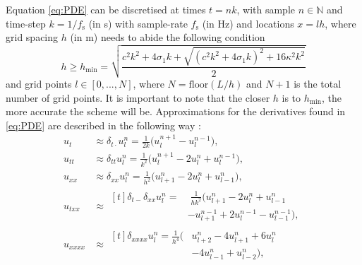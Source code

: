 \documentclass[twoside,a4paper,dvipsnames]{article}
\begin{document}
Equation \eqref{eq:PDE} can be discretised at times $t = nk$, with sample $n \in \mathbb{N}$ and time-step $k = 1 / f_\text{s}$ (in s) with sample-rate $f_\text{s}$ (in Hz) and locations $x = lh$, where grid spacing $h$ (in m) needs to abide the following condition \cite{Bilbao2009}
\begin{equation}\label{eq:stability}
    h \geq h_\text{min} = \sqrt{\frac{c^2k^2+4 \sigma_1k+\sqrt{(c^2k^2+4\sigma_1k)^2+16\kappa^2k^2}}{2}}
\end{equation}
and grid points $l \in [0,...,N]$, where $N=\text{floor}(L/h)$ and $N + 1$ is the total number of grid points. It is important to note that the closer $h$ is to $h_\text{min}$, the more accurate the scheme will be. 
Approximations for the derivatives found in \eqref{eq:PDE} are described in the following way \cite{Bilbao2009}: 
\begin{subequations}\label{eq:approximations}
    \begin{align}
        \label{eq:centerTime}
        u_{t} &\approx \delta_{t\cdot} u^n_l = \frac{1}{2k}\big(u_l^{n+1}-u_l^{n-1}\big),\\
        \label{eq:secondTime}
        u_{tt} &\approx \delta_{tt}u_l^n = \frac{1}{k^2} \big(u_l^{n+1} - 2u_l^n + u_l^{n-1}\big),\\
        \label{eq:secondSpacex}
        u_{xx} &\approx \delta_{xx}u_l^n = \frac{1}{h^2}\big(u_{l+1}^n - 2u_l^n + u_{l-1}^n\big),\\
        u_{txx} &\approx \label{eq:timeSpace}
        \begin{aligned}[t]\delta_{t-}\delta_{xx}u_l^n =& \; \frac{1}{hk^2}\big(u_{l+1}^n - 2u_l^n + u_{l-1}^n \\
        &- u_{l+1}^{n-1} + 2u_l^{n-1} - u_{l-1}^{n-1}\big),
        \end{aligned}\\
        \label{eq:fourthSpacex}
        u_{xxxx} &\approx\begin{aligned}[t] \delta_{xxxx}u_l^n = \frac{1}{h^4}\big(&u_{l+2}^n - 4u_{l+1}^n + 6u_l^n \\
        &- 4u_{l-1}^n +u_{l-2}^n\big),
        \end{aligned}
    \end{align}
\end{subequations}
\end{document}
